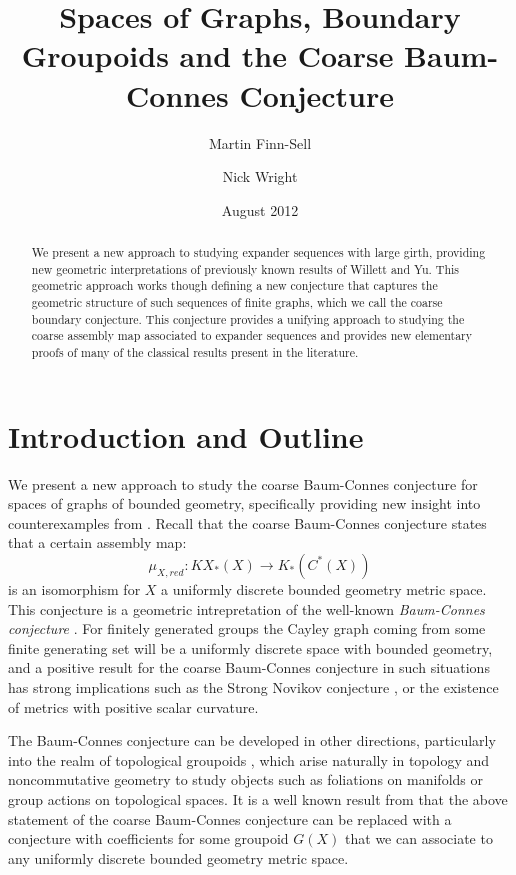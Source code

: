 \documentclass[11pt]{amsart}
\title{Spaces of Graphs, Boundary Groupoids and the Coarse Baum-Connes Conjecture}
\date{August 2012}
\author{Martin Finn-Sell \and Nick Wright}
\theoremstyle{plain}
\theoremstyle{definition}%
\theoremstyle{remark}%
\begin{document}

\begin{abstract}
We present a new approach to studying expander sequences with large girth, providing new geometric interpretations of previously known results of Willett and Yu. This geometric approach works though defining a new conjecture that captures the geometric structure of such sequences of finite graphs, which we call the coarse boundary conjecture. This conjecture provides a unifying approach to studying the coarse assembly map associated to expander sequences and provides new elementary proofs of many of the classical results present in the literature.
\end{abstract}

\maketitle

\section{Introduction and Outline}

We present a new approach to study the coarse Baum-Connes conjecture for spaces of graphs of bounded geometry, specifically providing new insight into counterexamples from \cite{higsonpreprint,MR1911663,explg1}. Recall that the coarse Baum-Connes conjecture states that a certain assembly map:
\begin{equation*}
\mu_{X,red}:KX_{*}(X) \longrightarrow K_{*}(C^{*}(X))
\end{equation*}
is an isomorphism for $X$ a uniformly discrete bounded geometry metric space. This conjecture is a geometric intrepretation of the well-known \textit{Baum-Connes conjecture} \cite{MR1292018}. For finitely generated groups the Cayley graph coming from some finite generating set will be a uniformly discrete space with bounded geometry, and a positive result for the coarse Baum-Connes conjecture in such situations has strong implications such as the Strong Novikov conjecture \cite{MR866507}, or the existence of metrics with positive scalar curvature.

The Baum-Connes conjecture can be developed in other directions, particularly into the realm of topological groupoids \cite{MR1798599}, which arise naturally in topology and noncommutative geometry to study objects such as foliations on manifolds or group actions on topological spaces. It is a well known result from \cite{MR1905840} that the above statement of the coarse Baum-Connes conjecture can be replaced with a conjecture with coefficients for some groupoid $G(X)$ that we can associate to any uniformly discrete bounded geometry metric space.
\end{document}
